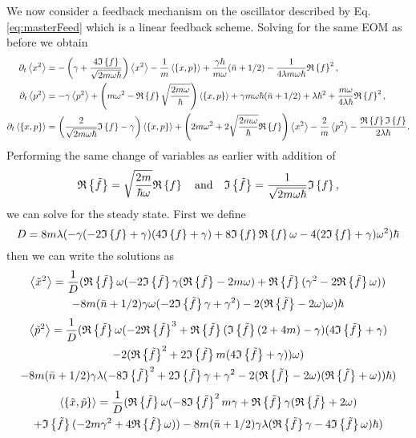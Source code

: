 We now consider a feedback mechanism on the oscillator described by Eq. \eqref{eq:masterFeed} which is a linear feedback scheme. Solving for the same EOM as before we obtain
\begin{align}
    \dt \expval{x^2} &= -\left(\gamma + \frac{4\im{f}}{\sqrt{2 m \omega \hbar}}\right) \expval{x^2} - \frac{1}{m} \expval{\acomm{x}{p}} + \frac{\gamma \hbar}{m \omega} (\nbar + 1/2) - \frac{1}{4\lambda m \omega \hbar} \re{f}^2,\\
    \dt \expval{p^2} &=  -\gamma \expval{p^2} + \left( m\omega^2 - \re{f} \sqrt{\frac{2m \omega}{\hbar}} \right)\expval{\acomm{x}{p}} + \gamma m \omega \hbar (\nbar + 1/2) + \lambda \hbar^2 + \frac{m \omega}{4 \lambda \hbar}\re{f}^2 ,\\
    \dt \expval{\acomm{x}{p}} &= \left(\frac{2}{\sqrt{2m \omega \hbar}}\im{f} - \gamma  \right)\expval{\acomm{x}{p}} + \left(2 m \omega^2 + 2 \sqrt{\frac{2 m \omega}{\hbar}}\re{f} \right) \expval{x^2} - \frac{2}{m} \expval{p^2} - \frac{\re{f} \im{f}}{2 \lambda \hbar}.
\end{align}
Performing the same change of variables as earlier with addition of 
\begin{equation}
    \mathfrak{R}\left\{\tilde{f}\right\} = \sqrt{\frac{2 m}{\hbar \omega}} \mathfrak{R}\left\{f\right\} \quad \text{and} \quad \mathfrak{I}\left\{\tilde{f}\right\} = \frac{1}{\sqrt{2 m \omega \hbar}} \mathfrak{I}\left\{f\right\}, 
\end{equation}
we can solve for the steady state. First we define
\begin{equation}
    D = 8m\lambda ( -\gamma ( -2\mathfrak{I}\left\{f\right\} + \gamma ) (4\mathfrak{I}\left\{f\right\} + \gamma)+ 8\mathfrak{I}\left\{f\right\}\mathfrak{R}\left\{f\right\} \omega - 4 (2\mathfrak{I}\left\{f\right\} + \gamma)\omega^2 )\hbar
\end{equation}
then we can write the solutions as
\begin{multline}
    \expval{\tilde{x}^2} = \frac{1}{D} (\mathfrak{R}\left\{\tilde{f}\right\} \omega (-2 \mathfrak{I}\left\{\tilde{f}\right\} \gamma ( \mathfrak{R}\left\{\tilde{f}\right\} - 2m \omega ) + \mathfrak{R}\left\{\tilde{f}\right\} (\gamma^2 - 2 \mathfrak{R}\left\{\tilde{f}\right\} \omega) ) \\ -8m (\bar{n} + 1/2)\gamma \omega(-2\mathfrak{I}\left\{\tilde{f}\right\}\gamma + \gamma^2) - 2(\mathfrak{R}\left\{\tilde{f}\right\}- 2\omega)\omega )\hbar
\end{multline}
\begin{multline}
    \expval{\tilde{p}^2} = \frac{1}{D} (\mathfrak{R}\left\{\tilde{f}\right\} \omega ( -2 \mathfrak{R}\left\{\tilde{f}\right\}^3 + \mathfrak{R}\left\{\tilde{f}\right\} ( \mathfrak{I}\left\{\tilde{f}\right\}(2 + 4m) - \gamma )(4 \mathfrak{I}\left\{\tilde{f}\right\} + \gamma) \\- 2( \mathfrak{R}\left\{\tilde{f}\right\}^2 + 2 \mathfrak{I}\left\{\tilde{f}\right\} m (4 \mathfrak{I}\left\{\tilde{f}\right\} + \gamma) ) \omega ) \\- 8m(\bar{n} + 1/2) \gamma \lambda ( -8 \mathfrak{I}\left\{\tilde{f}\right\}^2 + 2 \mathfrak{I}\left\{\tilde{f}\right\} \gamma + \gamma^2 - 2 (\mathfrak{R}\left\{\tilde{f}\right\} - 2 \omega)(\mathfrak{R}\left\{\tilde{f}\right\} + \omega) ) \hbar
    ) 
\end{multline}
\begin{multline}
    \expval{\acomm{\tilde{x}}{\tilde{p}}} = \frac{1}{D} (\re{\tilde{f}} \omega ( -8 \im{\tilde{f}}^2 m \gamma + \re{\tilde{f}} \gamma (\re{\tilde{f}} + 2 \omega) \\+ \im{\tilde{f}} (-2 m \gamma^2 + 4 \re{\tilde{f}} \omega) ) - 8 m (\nbar + 1/2) \gamma \lambda (\re{\tilde{f}} \gamma - 4 \im{\tilde{f}} \omega) \hbar
    )
\end{multline}